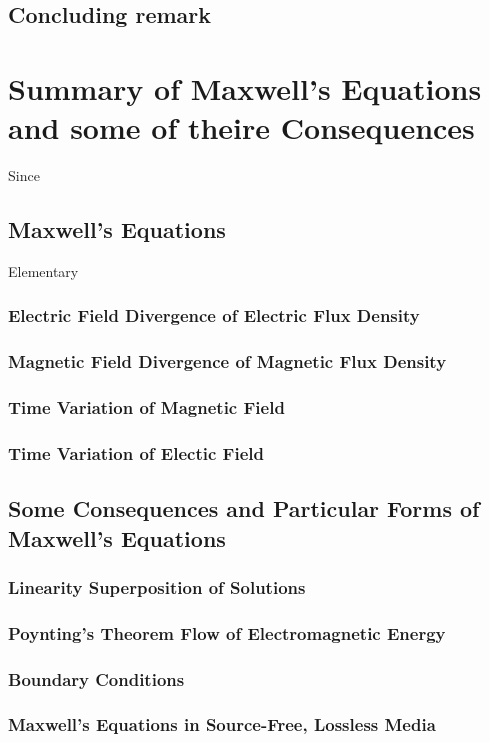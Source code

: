 \section{Concluding remark}

\chapter{Summary of Maxwell's Equations and some of theire Consequences}
Since

\section{Maxwell's Equations}
Elementary 
\subsection{Electric Field Divergence of Electric Flux Density}
\subsection{Magnetic Field Divergence of Magnetic Flux Density}
\subsection{Time Variation of Magnetic Field}
\subsection{Time Variation of Electic Field}

\section{Some Consequences and Particular Forms of Maxwell's Equations}
\subsection{Linearity Superposition of Solutions}
\subsection{Poynting's Theorem Flow of Electromagnetic Energy}
\subsection{Boundary Conditions}
\label{subsec:bc}
\subsection{Maxwell's Equations in Source-Free, Lossless Media}
